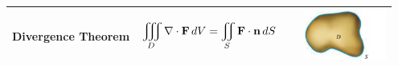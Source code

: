 \documentclass[mathNotesPreamble]{subfiles}
\begin{document}
\begin{center}
\begin{tabular}{@{}m{0.32\linewidth}m{0.4\linewidth}m{0.23\linewidth}@{}}
      \textbf{Divergence Theorem}& $\displaystyle\iiint\limits_D \nabla\cdot\mathbf F\,dV=\iint\limits_S \mathbf F\cdot{\mathbf{n}}\,dS$& \includegraphics[width=\linewidth]{images/briggs_17_08/tab17_04e}\\\bottomrule
    \end{tabular}
  \end{center}
  
\end{document}
